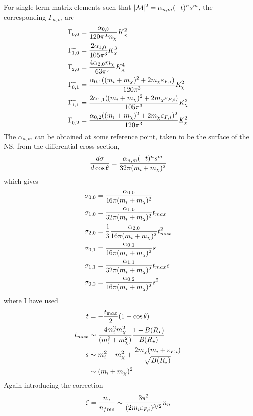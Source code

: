 For single term matrix elements such that $|\overline{\mathcal M}|^2 = \alpha_{n,m}(-t)^n s^m$, the corresponding $\Gamma_{n,m}^-$ are
\begin{align}
    \Gamma^-_{0,0} & = \frac{\alpha_{0,0}}{120\pi^3 m_\chi}K_\chi^2\\
    \Gamma^-_{1,0} & = \frac{2\alpha_{1,0}}{105\pi^3}K_\chi^3\\
    \Gamma^-_{2,0} & = \frac{4\alpha_{2,0}m_\chi}{63\pi^3}K_\chi^4\\
    \Gamma^-_{0,1} & = \frac{\alpha_{0,1}((m_i + m_\chi)^2 + 2m_\chi \varepsilon_{F,i})}{120\pi^3}K_\chi^2\\
    \Gamma^-_{1,1} & = \frac{2\alpha_{1,1}((m_i + m_\chi)^2 + 2m_\chi \varepsilon_{F,i})}{105\pi^3}K_\chi^3\\
    \Gamma^-_{0,2} & = \frac{\alpha_{0,2}((m_i + m_\chi)^2 + 2m_\chi \varepsilon_{F,i})^2}{120\pi^3}K_\chi^2
\end{align}
The $\alpha_{n,m}$ can be obtained at some reference point, taken to be the surface of the NS, from the differential cross-section,
\begin{equation}
    \frac{d \sigma }{d\cos\theta} = \frac{\alpha_{n,m}(-t)^n s^m}{32 \pi (m_i + m_\chi)^2}
\end{equation}
which gives
\begin{align}
    \sigma_{0,0} & = \frac{\alpha_{0,0}}{16 \pi (m_i + m_\chi)^2}\\
    \sigma_{1,0} & = \frac{\alpha_{1,0} }{32 \pi (m_i + m_\chi)^2}t_{max}\\
    \sigma_{2,0} & = \frac{1}{3}\frac{\alpha_{2,0} }{16 \pi (m_i + m_\chi)^2}t_{max}^2\\
    \sigma_{0,1} & = \frac{\alpha_{0,1}}{16 \pi (m_i + m_\chi)^2}s\\
    \sigma_{1,1} & = \frac{\alpha_{1,1} }{32 \pi (m_i + m_\chi)^2}t_{max}s\\
    \sigma_{0,2} & = \frac{\alpha_{0,2}}{16 \pi (m_i + m_\chi)^2}s^2
\end{align}
where I have used 
\begin{align}
    t & = -\frac{t_{max}}{2}(1 - \cos\theta)\\
    t_{max} & \sim \frac{4 m_i^2 m_\chi^2}{(m_i^2 + m_\chi^2)}\frac{1 - B(R_\star)}{B(R_\star)}\\
    s & \sim m_i^2 + m_\chi^2 + \frac{2m_\chi (m_i +\varepsilon_{F,i})}{\sqrt{B(R_\star)}}\\
    &\sim (m_i +m_\chi)^2
\end{align}
Again introducing the correction 
\begin{equation}
    \zeta = \frac{n_n}{n_{free}} \sim \frac{3\pi^2}{(2m_i \varepsilon_{F,i})^{3/2}}n_n
\end{equation}
